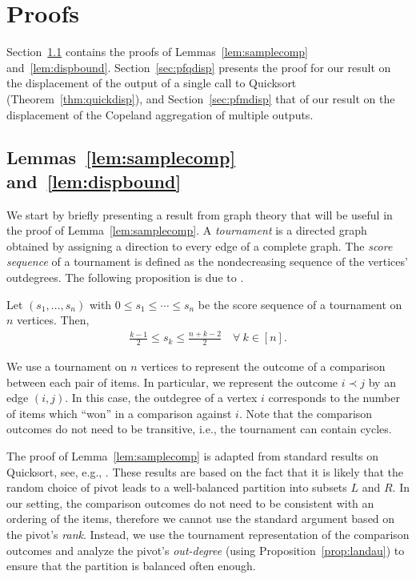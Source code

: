 \section{Proofs}  %
\label{app:proofs}

Section~\ref{sec:pflemmas} contains the proofs of Lemmas~\ref{lem:samplecomp} and~\ref{lem:dispbound}.
Section~\ref{sec:pfqdisp} presents the proof for our result on the displacement of the output of a single call to Quicksort (Theorem~\ref{thm:quickdisp}), and Section~\ref{sec:pfmdisp} that of our result on the displacement of the Copeland aggregation of multiple outputs.

\subsection{Lemmas~\ref{lem:samplecomp} and~\ref{lem:dispbound}}
\label{sec:pflemmas}

We start by briefly presenting a result from graph theory that will be useful in the proof of Lemma~\ref{lem:samplecomp}.
A \emph{tournament} is a directed graph obtained by assigning a direction to every edge of a complete graph.
The \emph{score sequence} of a tournament is defined as the nondecreasing sequence of the vertices' outdegrees.
The following proposition is due to \citet{landau1953dominance}.

\begin{proposition}
\label{prop:landau}
Let $(s_1, \ldots, s_n)$ with $0 \le s_1 \le \cdots \le s_n$ be the score sequence of a tournament on $n$ vertices.
Then,
\begin{align*}
\frac{k - 1}{2} \le s_k \le \frac{n + k - 2}{2} \quad \forall\ k \in [n].
\end{align*}
\end{proposition}

We use a tournament on $n$ vertices to represent the outcome of a comparison between each pair of items.
In particular, we represent the outcome $i \prec j$ by an edge $(i, j)$.
In this case, the outdegree of a vertex $i$ corresponds to the number of items which ``won'' in a comparison against $i$.
Note that the comparison outcomes do not need to be transitive, i.e., the tournament can contain cycles.

The proof of Lemma~\ref{lem:samplecomp} is adapted from standard results on Quicksort, see, e.g., \citet[][Section 3.3.3]{dubhashi2009concentration}.
These results are based on the fact that it is likely that the random choice of pivot leads to a well-balanced partition into subsets $L$ and $R$.
In our setting, the comparison outcomes do not need to be consistent with an ordering of the items, therefore we cannot use the standard argument based on the pivot's \emph{rank}.
Instead, we use the tournament representation of the comparison outcomes and analyze the pivot's \emph{out-degree} (using Proposition~\ref{prop:landau}) to ensure that the partition is balanced often enough.

